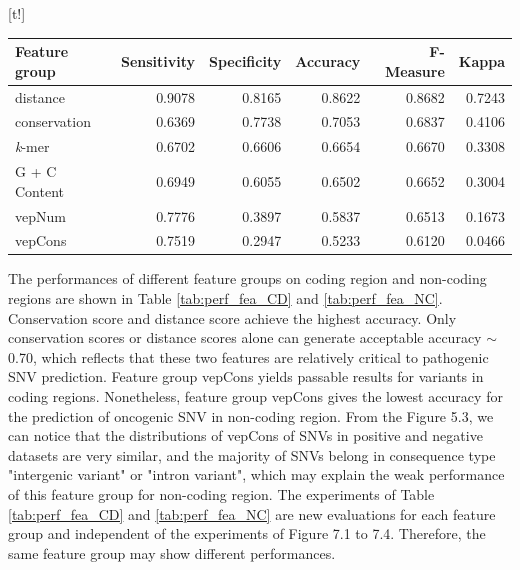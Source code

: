 \documentclass[a4paper,nohyper,nobib,openany,justified]{tufte-book}
\makeatletter
\renewenvironment{table}[1][htbp]{%
  \@tufte@orig@float{table}[#1]%
}{%
  \@tufte@orig@endfloat
}
\makeatother
\begin{document}
\begin{fullwidth}
\begin{table}[t!]
  \begin{center}
    \footnotesize%
    \begin{tabular}{lrrrrr}
      \toprule
      Feature group & Sensitivity & Specificity & Accuracy & F-Measure & Kappa \\
      \midrule
    distance           & 0.9078 & 0.8165 & 0.8622 & 0.8682 & 0.7243 \\
    conservation       & 0.6369 & 0.7738 & 0.7053 & 0.6837 & 0.4106 \\
    \emph{k}-mer              & 0.6702 & 0.6606 & 0.6654 & 0.6670 & 0.3308 \\
    G + C Content      & 0.6949 & 0.6055 & 0.6502 & 0.6652 & 0.3004 \\
    vepNum & 0.7776 & 0.3897 & 0.5837 & 0.6513 & 0.1673 \\
    vepCons   & 0.7519 & 0.2947 & 0.5233 & 0.6120 & 0.0466 \\
      \bottomrule
    \end{tabular}
  \end{center}
  \caption{Performance of different feature groups evaluated on test set for non-coding region. Random forest classifier is built using training and validation set, and parameters are fine-tuned using 10-fold CV.}
  \label{tab:perf_fea_NC}
\end{table}

The performances of different feature groups on coding region and non-coding regions are shown in Table \ref{tab:perf_fea_CD} and \ref{tab:perf_fea_NC}. Conservation score and distance score achieve the highest accuracy. Only conservation scores or distance scores alone can generate acceptable accuracy $\sim$0.70, which reflects that these two features are relatively critical to pathogenic SNV prediction. Feature group vepCons yields passable results for variants in coding regions. Nonetheless, feature group vepCons gives the lowest accuracy for the prediction of oncogenic SNV in non-coding region. From the Figure 5.3, we can notice that the distributions of vepCons of SNVs in positive and negative datasets are very similar, and the majority of SNVs belong in consequence type "intergenic variant" or "intron variant", which may explain the weak performance of this feature group for non-coding region. The experiments of Table \ref{tab:perf_fea_CD} and \ref{tab:perf_fea_NC} are new evaluations for each feature group and independent of the experiments of Figure 7.1 to 7.4. Therefore, the same feature group may show different performances.


\end{fullwidth}
\end{document}
